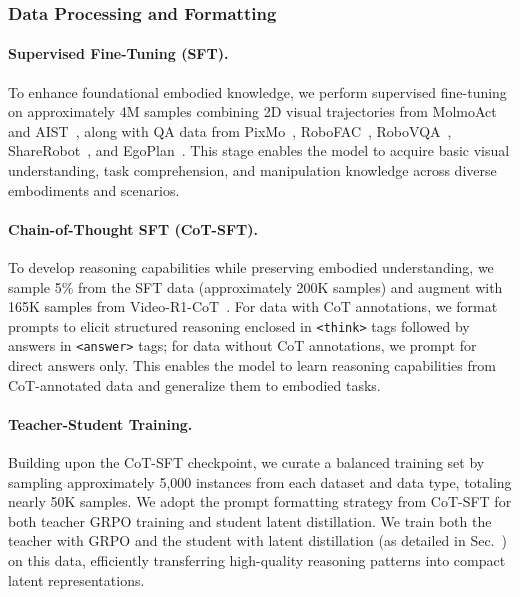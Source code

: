 \subsubsection{Data Processing and Formatting}


\paragraph{Supervised Fine-Tuning (SFT).} To enhance foundational embodied knowledge, we perform supervised fine-tuning on approximately 4M samples combining 2D visual trajectories from MolmoAct~\cite{lee2025molmoact} and AIST~\cite{aist2025aist}, along with QA data from PixMo~\cite{deitke2024molmo}, RoboFAC~\cite{lu2025robofac}, RoboVQA~\cite{sermanet2024robovqa}, ShareRobot~\cite{ji2025robobrain}, and EgoPlan~\cite{chen2023egoplan}. This stage enables the model to acquire basic visual understanding, task comprehension, and manipulation knowledge across diverse embodiments and scenarios.

\paragraph{Chain-of-Thought SFT (CoT-SFT).} To develop reasoning capabilities while preserving embodied understanding, we sample 5\% from the SFT data (approximately 200K samples) and augment with 165K samples from Video-R1-CoT~\cite{feng2025video}. For data with CoT annotations, we format prompts to elicit structured reasoning enclosed in \texttt{<think>} tags followed by answers in \texttt{<answer>} tags; for data without CoT annotations, we prompt for direct answers only. This enables the model to learn reasoning capabilities from CoT-annotated data and generalize them to embodied tasks.

\paragraph{Teacher-Student Training.} Building upon the CoT-SFT checkpoint, we curate a balanced training set by sampling approximately 5,000 instances from each dataset and data type, totaling nearly 50K samples. We adopt the prompt formatting strategy from CoT-SFT for both teacher GRPO training and student latent distillation. We train both the teacher with GRPO and the student with latent distillation (as detailed in Sec.~) on this data, efficiently transferring high-quality reasoning patterns into compact latent representations.






